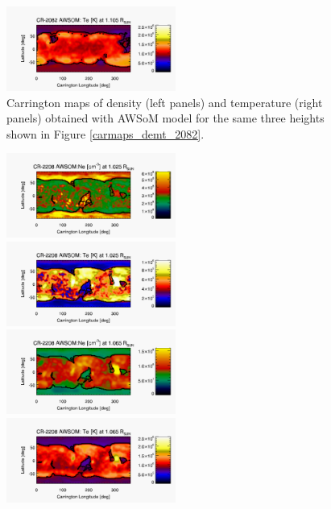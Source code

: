 \documentclass[namedreferences]{solarphysics}
\begin{document}
\begin{article}
\begin{figure}[h!]
\begin{center}
\includegraphics[width=0.495\textwidth]{figs/map_Te_awsom_2082_185_short_1105_Rsun.pdf}
\caption{Carrington maps of density (left panels) and temperature (right panels) obtained with AWSoM model for the same three heights shown in Figure \ref{carmaps_demt_2082}.}
\label{carmaps_awsom_2082}
\end{center}
\end{figure}

\begin{figure}[h!]
\begin{center}
\includegraphics[width=0.495\textwidth]{figs/map_Ne_awsom_2208_185_short_1025_Rsun.pdf}
\includegraphics[width=0.495\textwidth]{figs/map_Te_awsom_2208_185_short_1025_Rsun.pdf}
\includegraphics[width=0.495\textwidth]{figs/map_Ne_awsom_2208_185_short_1065_Rsun.pdf}
\includegraphics[width=0.495\textwidth]{figs/map_Te_awsom_2208_185_short_1065_Rsun.pdf}

\end{center}
\end{figure}
\end{article}
\end{document}
